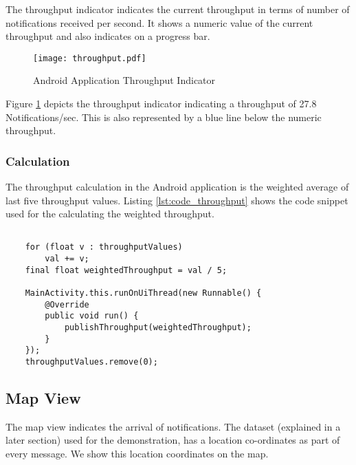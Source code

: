 The throughput indicator indicates the current throughput in terms of number of notifications received per second. It shows a numeric value of the current throughput and also indicates on a progress bar.

\makeatletter
\setlength{\intextsep}{20pt}
\makeatother

\begin{figure}[h!]
\centering
\texttt{[image: throughput.pdf]}
\caption{Android Application Throughput Indicator}\label{figures:android_throughput}
\end{figure}

Figure {\ref{figures:android_throughput}} depicts the throughput indicator indicating a throughput of 27.8 Notifications/sec. This is also represented by a blue line below the numeric throughput.

\subsubsection{Calculation}

The throughput calculation in the Android application is the weighted average of last five throughput values.
Listing \ref{lst:code_throughput} shows the code snippet used for the calculating the weighted throughput.

\bigskip
\begin{lstlisting}[style=JavaInputStyle,caption=Throughput calculation code snippet, label={lst:code_throughput}]

    for (float v : throughputValues)
        val += v;
    final float weightedThroughput = val / 5;

    MainActivity.this.runOnUiThread(new Runnable() {
        @Override
        public void run() {
            publishThroughput(weightedThroughput);
        }
    });
    throughputValues.remove(0);

\end{lstlisting}

\subsection{Map View}

The map view indicates the arrival of notifications. The dataset (explained in a later section) used for the demonstration, has a location co-ordinates as part of every message. We show this location coordinates on the map.  

\makeatletter
\setlength{\intextsep}{20pt}
\makeatother

